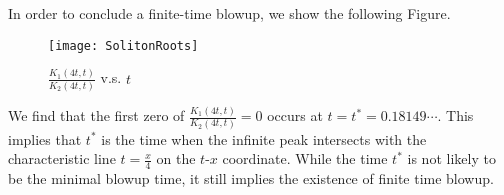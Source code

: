 \documentclass[11pt]{article}
\begin{document}
In order to conclude a finite-time blowup, we show the following Figure.
\begin{figure}[htbp] %
   \centering
   \texttt{[image: SolitonRoots]} 
   \caption{$\frac{K_1(4t,t)}{K_2(4t,t)}$ v.s. $t$ }
   \label{figblowup}
\end{figure}

We find that the first zero of $\frac{K_1(4t,t)}{K_2(4t,t)}=0$ occurs at $t=t^*=0.18149\cdots.$ This implies that $t^*$ is the time when the infinite peak intersects with the characteristic line $t=\frac{x}{4}$ on the $t$-$x$ coordinate. While the time $t^*$ is not likely to be the minimal blowup time, it still implies the existence of finite time blowup.

\end{document}
